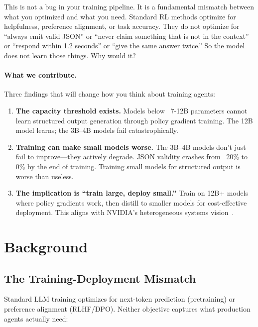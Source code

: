 \documentclass[11pt]{article}
\begin{document}
This is not a bug in your training pipeline.
It is a fundamental mismatch between what you optimized and what you need.
Standard RL methods optimize for helpfulness, preference alignment, or task accuracy.
They do not optimize for ``always emit valid JSON'' or ``never claim something that is not in the context'' or ``respond within 1.2 seconds'' or ``give the same answer twice.''
So the model does not learn those things.
Why would it?

\paragraph{What we contribute.}
Three findings that will change how you think about training agents:

\begin{enumerate}[leftmargin=12pt]
    \item \textbf{The capacity threshold exists.}
    Models below ~7-12B parameters cannot learn structured output generation through policy gradient training.
    The 12B model learns; the 3B--4B models fail catastrophically.

    \item \textbf{Training can make small models worse.}
    The 3B--4B models don't just fail to improve---they actively degrade.
    JSON validity crashes from ~20\% to 0\% by the end of training.
    Training small models for structured output is worse than useless.

    \item \textbf{The implication is ``train large, deploy small.''}
    Train on 12B+ models where policy gradients work, then distill to smaller models for cost-effective deployment.
    This aligns with NVIDIA's heterogeneous systems vision~\citep{nvidia2025slm}.
\end{enumerate}

\section{Background}
\label{sec:background}

\subsection{The Training-Deployment Mismatch}

Standard LLM training optimizes for next-token prediction (pretraining) or preference alignment (RLHF/DPO).
Neither objective captures what production agents actually need:
\end{document}
